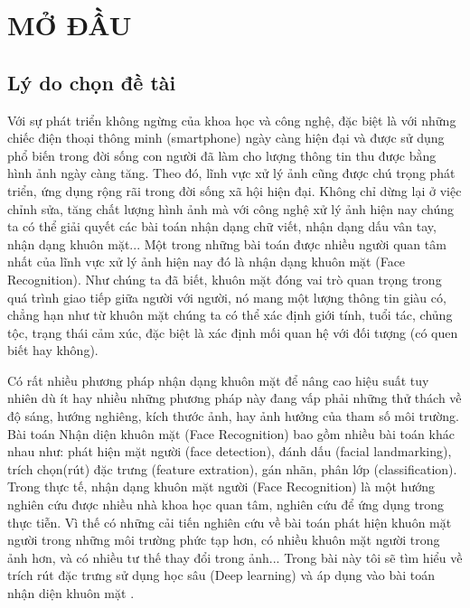 

\chapter*{MỞ ĐẦU}
\label{part:dimred}

\section{Lý do chọn đề tài}

Với sự phát triển không ngừng của khoa học và công nghệ, đặc biệt là với những
chiếc điện thoại thông minh (smartphone) ngày càng hiện đại và được sử dụng
phổ biến trong đời sống con người đã làm cho lượng thông tin thu được bằng hình ảnh
ngày càng tăng. Theo đó, lĩnh vực xử lý ảnh cũng được chú trọng phát triển, ứng dụng
rộng rãi trong đời sống xã hội hiện đại. Không chỉ dừng lại ở việc chỉnh sửa, tăng
chất lượng hình ảnh mà với công nghệ xử lý ảnh hiện nay chúng ta có thể giải quyết
các bài toán nhận dạng chữ viết, nhận dạng dấu vân tay, nhận dạng khuôn mặt...
Một trong những bài toán được nhiều người quan tâm nhất của lĩnh vực xử lý ảnh hiện nay
đó là nhận dạng khuôn mặt (Face Recognition). Như chúng ta đã biết, khuôn mặt đóng
vai trò quan trọng trong quá trình giao tiếp giữa người với người, nó mang một lượng
thông tin giàu có, chẳng hạn như từ khuôn mặt chúng ta có thể xác định giới tính, tuổi tác,
chủng tộc, trạng thái cảm xúc, đặc biệt là xác định mối quan hệ với đối tượng (có quen biết
hay không).

Có rất nhiều phương pháp nhận dạng khuôn mặt để nâng cao hiệu suất tuy nhiên dù ít hay
nhiều những phương pháp này đang vấp phải những thử thách về độ sáng, hướng nghiêng,
kích thước ảnh, hay ảnh hưởng của tham số môi trường. Bài toán
Nhận diện khuôn mặt (Face Recognition) bao gồm nhiều bài toán khác nhau như:
phát hiện mặt người (face detection), đánh dấu (facial landmarking), trích chọn(rút) đặc trưng
(feature extration), gán nhãn, phân lớp (classification).
Trong thực tế, nhận dạng khuôn mặt người (Face Recognition) là một hướng nghiên cứu được
nhiều nhà khoa học quan tâm, nghiên cứu để ứng dụng trong thực tiễn.
Vì thế có những cải tiến nghiên cứu về bài toán phát hiện khuôn mặt người trong
những môi trường phức tạp hơn, có nhiều khuôn mặt người trong ảnh hơn,
và có nhiều tư thế thay đổi trong ảnh... Trong bài này tôi sẽ tìm hiểu về trích rút đặc
trưng sử dụng học sâu (Deep learning) và áp dụng vào bài toán nhận diện khuôn mặt .

